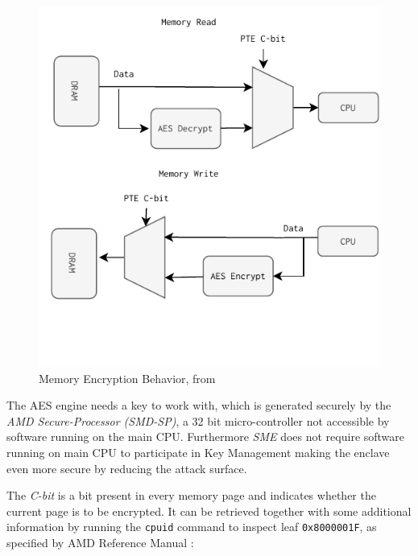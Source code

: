 \documentclass[twocolumn]{article}
\begin{document}
\begin{figure}
    \centering
    \includegraphics[scale=0.9]{img/read-write.pdf}
    \caption{Memory Encryption Behavior, from \cite{memory-encryption}}
    \label{fig:memory-encryption-fig}
\end{figure}

The AES engine needs a key to work with, which is generated securely by the \textit{AMD Secure-Processor (SMD-SP)}, a 32 bit micro-controller not accessible by software running on the main CPU. Furthermore \textit{SME} does not require software running on main CPU to participate in Key Management making the enclave even more secure by reducing the attack surface.

The \textit{C-bit} is a bit present in every memory page and indicates whether the current page is to be encrypted. It can be retrieved together with some additional information by running the \texttt{cpuid} command to inspect leaf \texttt{0x8000001F}, as specified by AMD Reference Manual \cite{architecture-reference}:
\end{document}
